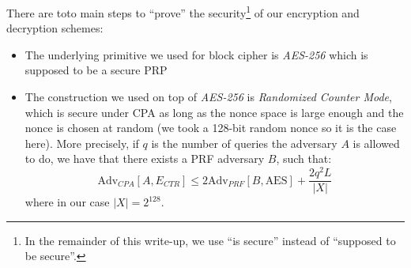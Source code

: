 \documentclass[10pt,twocolumn]{article}
\begin{document}
There are toto main steps to ``prove'' the security\footnote{In the remainder of this write-up, we use ``is secure''
instead of ``supposed to be secure''.}  of our encryption and decryption schemes:
\begin{itemize}
\item The underlying primitive we used for block cipher is \emph{AES-256} which is supposed to be a secure PRP
\item The construction we used on top of \emph{AES-256} is \emph{Randomized Counter Mode}, which is secure under CPA as long as the nonce space is large enough and the nonce is chosen at random (we took a 128-bit random nonce so it is the case here).
More precisely, if $q$ is the number of queries the adversary $A$ is allowed to do, we have that there exists a PRF adversary $B$, such that:
\[
 \text{Adv}_{CPA}[A,E_{CTR}] \leq 2 \text{Adv}_{PRF}[B,\text{AES}] + \frac{2q^2L}{|X|} 
\]
where in our case $|X| = 2^{128}$.

\end{itemize}
\end{document}
